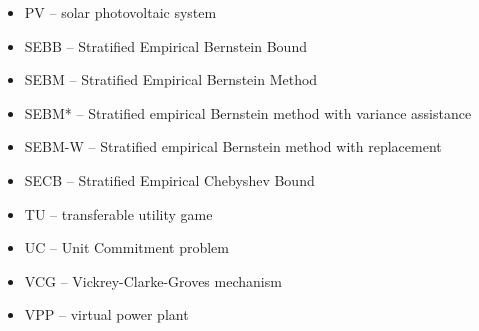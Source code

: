 \begin{itemize}
\item	PV -- solar photovoltaic system
\item	SEBB -- Stratified Empirical Bernstein Bound
\item	SEBM -- Stratified Empirical Bernstein Method
\item	SEBM* -- Stratified empirical Bernstein method with variance assistance
\item	SEBM-W -- Stratified empirical Bernstein method with replacement
\item	SECB -- Stratified Empirical Chebyshev Bound
\item	TU -- transferable utility game
\item	UC -- Unit Commitment problem
\item	VCG -- Vickrey-Clarke-Groves mechanism
\item	VPP -- virtual power plant
\end{itemize}



